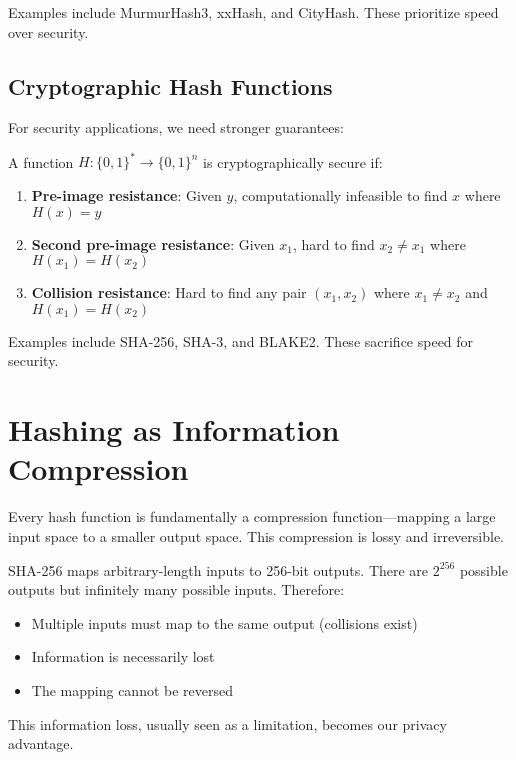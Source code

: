 Examples include MurmurHash3, xxHash, and CityHash. These prioritize speed over security.

\subsection{Cryptographic Hash Functions}

For security applications, we need stronger guarantees:

\begin{definition}
A function $H: \{0,1\}^* \to \{0,1\}^n$ is cryptographically secure if:
\begin{enumerate}
\item \textbf{Pre-image resistance}: Given $y$, computationally infeasible to find $x$ where $H(x) = y$
\item \textbf{Second pre-image resistance}: Given $x_1$, hard to find $x_2 \neq x_1$ where $H(x_1) = H(x_2)$
\item \textbf{Collision resistance}: Hard to find any pair $(x_1, x_2)$ where $x_1 \neq x_2$ and $H(x_1) = H(x_2)$
\end{enumerate}
\end{definition}

Examples include SHA-256, SHA-3, and BLAKE2. These sacrifice speed for security.

\section{Hashing as Information Compression}

Every hash function is fundamentally a compression function—mapping a large input space to a smaller output space. This compression is lossy and irreversible.

\begin{example}
SHA-256 maps arbitrary-length inputs to 256-bit outputs. There are $2^{256}$ possible outputs but infinitely many possible inputs. Therefore:
\begin{itemize}
\item Multiple inputs must map to the same output (collisions exist)
\item Information is necessarily lost
\item The mapping cannot be reversed
\end{itemize}
\end{example}

This information loss, usually seen as a limitation, becomes our privacy advantage.

